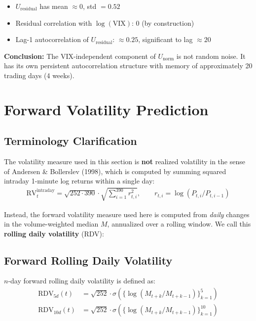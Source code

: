 \documentclass[11pt]{article}
\begin{document}
\begin{itemize}
    \item $U_\mathrm{residual}$ has mean $\approx 0$, std $= 0.52$
    \item Residual correlation with $\log(\mathrm{VIX})$: 0 (by construction)
    \item Lag-1 autocorrelation of $U_\mathrm{residual}$: $\approx 0.25$, significant to lag $\approx 20$
\end{itemize}

\textbf{Conclusion:} The VIX-independent component of $U_\mathrm{norm}$ is not random noise. It has its own persistent autocorrelation structure with memory of approximately 20 trading days (4 weeks).

\section{Forward Volatility Prediction}

\subsection{Terminology Clarification}

The volatility measure used in this section is \textbf{not} realized volatility in the sense of Andersen \& Bollerslev (1998), which is computed by summing squared intraday 1-minute log returns within a single day:
\begin{align}
    \mathrm{RV}^{\mathrm{intraday}}_t = \sqrt{252 \cdot 390} \cdot \sqrt{\sum_{i=1}^{390} r_{t,i}^2}, \qquad r_{t,i} = \log(P_{t,i}/P_{t,i-1})
\end{align}

Instead, the forward volatility measure used here is computed from \textit{daily} changes in the volume-weighted median $M$, annualized over a rolling window. We call this \textbf{rolling daily volatility} (RDV):

\subsection{Forward Rolling Daily Volatility}

$n$-day forward rolling daily volatility is defined as:
\begin{align}
    \mathrm{RDV}_{5d}(t) &= \sqrt{252} \cdot \sigma\left(\{\log(M_{t+k}/M_{t+k-1})\}_{k=1}^{5}\right) \\
    \mathrm{RDV}_{10d}(t) &= \sqrt{252} \cdot \sigma\left(\{\log(M_{t+k}/M_{t+k-1})\}_{k=1}^{10}\right)
\end{align}
\end{document}
